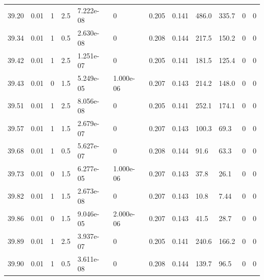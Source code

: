 \documentclass[preview]{standalone}
\begin{document}
{{{{{{{{{{{{\begin{tabular}{L{1.2cm}C{1.2cm} C{0.3cm}C{0.5cm} C{1.4cm}C{1.4cm} C{1.4cm}C{1.4cm} C{1.6cm}C{1.6cm} C{1.6cm}C{1.6cm}}
  39.20  &  0.01  & 1     & 2.5 &  7.222e-08  & 0  &  0.205&   0.141& 486.0 & 335.7   &  0 & 0  \\ 
  39.34  &  0.01  & 1     & 0.5 &  2.630e-08  & 0  &  0.208&   0.144& 217.5 & 150.2   &  0 & 0  \\ 
  39.42  &  0.01  & 1     & 2.5 &  1.251e-07  & 0  &  0.205&   0.141& 181.5 & 125.4   &  0 & 0  \\ 
  39.43  &  0.01  & 0     & 1.5 &  5.249e-05  & 1.000e-06  &  0.207&   0.143& 214.2 & 148.0   &  0 & 0  \\ 
  39.51  &  0.01  & 1     & 2.5 &  8.056e-08  & 0  &  0.205&   0.141& 252.1 & 174.1   &  0 & 0  \\ 
  39.57  &  0.01  & 1     & 1.5 &  2.679e-07  & 0  &  0.207&   0.143& 100.3 & 69.3   &  0 & 0  \\ 
  39.68  &  0.01  & 1     & 0.5 &  5.627e-07  & 0  &  0.208&   0.144& 91.6 & 63.3   &  0 & 0  \\ 
  39.73  &  0.01  & 0     & 1.5 &  6.277e-05  & 1.000e-06  &  0.207&   0.143& 37.8 & 26.1   &  0 & 0  \\ 
  39.82  &  0.01  & 1     & 1.5 &  2.673e-08  & 0  &  0.207&   0.143& 10.8 & 7.44   &  0 & 0  \\ 
  39.86  &  0.01  & 0     & 1.5 &  9.046e-05  & 2.000e-06  &  0.207&   0.143& 41.5 & 28.7   &  0 & 0  \\ 
  39.89  &  0.01  & 1     & 2.5 &  3.937e-07  & 0  &  0.205&   0.141& 240.6 & 166.2   &  0 & 0  \\ 
  39.90  &  0.01  & 1     & 0.5 &  3.611e-08  & 0  &  0.208&   0.144& 139.7 & 96.5   &  0 & 0  \\ 
\hline 
\end{tabular} 

}}}}}}}}}}}}
\end{document}
